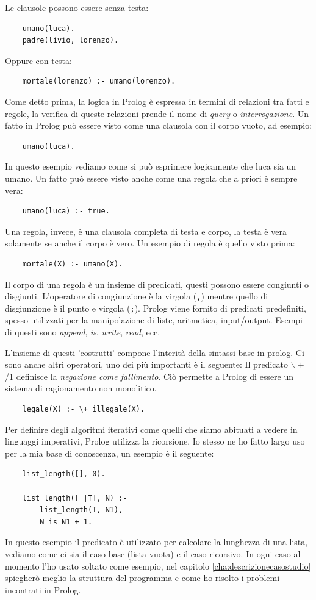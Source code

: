 Le clausole possono essere senza testa:
\begin{verbatim}
    umano(luca).
    padre(livio, lorenzo).
\end{verbatim}
Oppure con testa:
\begin{verbatim}
    mortale(lorenzo) :- umano(lorenzo).
\end{verbatim}

Come detto prima, la logica in Prolog è espressa in termini di relazioni tra fatti e regole, la verifica di queste relazioni
prende il nome di \textit{query} o \textit{interrogazione}.
Un fatto in Prolog può essere visto come una clausola con il corpo vuoto, ad esempio:
\begin{verbatim}
    umano(luca).
\end{verbatim}
In questo esempio vediamo come si può esprimere logicamente che luca sia un umano.
Un fatto può essere visto anche come una regola che a priori è sempre vera:
\begin{verbatim}
    umano(luca) :- true.
\end{verbatim}
Una regola, invece, è una clausola completa di testa e corpo, la testa è vera solamente se anche il corpo è vero.
Un esempio di regola è quello visto prima:
\begin{verbatim}
    mortale(X) :- umano(X).
\end{verbatim}

Il corpo di una regola è un insieme di predicati, questi possono essere congiunti o disgiunti. L'operatore di congiunzione è la
virgola (\verb+,+) mentre quello di disgiunzione è il punto e virgola (\verb+;+). Prolog viene fornito di predicati predefiniti, spesso
utilizzati per la manipolazione di liste, aritmetica, input/output. Esempi di questi sono \textit{append}, \textit{is}, \textit{write}, \textit{read}, ecc.

L'insieme di questi 'costrutti' compone l'interità della sintassi base in prolog. Ci sono anche altri operatori, uno dei più importanti è il seguente:
Il predicato $\backslash+$ /1 definisce la \textit{negazione come fallimento}. Ciò permette a Prolog di essere un sistema di ragionamento non monolitico.
\begin{verbatim}
    legale(X) :- \+ illegale(X).
\end{verbatim}

Per definire degli algoritmi iterativi come quelli che siamo abituati a vedere in linguaggi imperativi, Prolog utilizza la ricorsione. Io stesso ne ho fatto largo uso per la mia base di conoscenza,
un esempio è il seguente:
\begin{lstlisting}
    list_length([], 0).

    list_length([_|T], N) :-
        list_length(T, N1),
        N is N1 + 1.
\end{lstlisting}
In questo esempio il predicato è utilizzato per calcolare la lunghezza di una lista, vediamo come ci sia il caso base (lista vuota) e il caso ricorsivo.
In ogni caso al momento l'ho usato soltato come esempio, nel capitolo \ref{cha:descrizionecasostudio} spiegherò meglio la struttura del programma e come ho risolto i problemi incontrati in Prolog.
